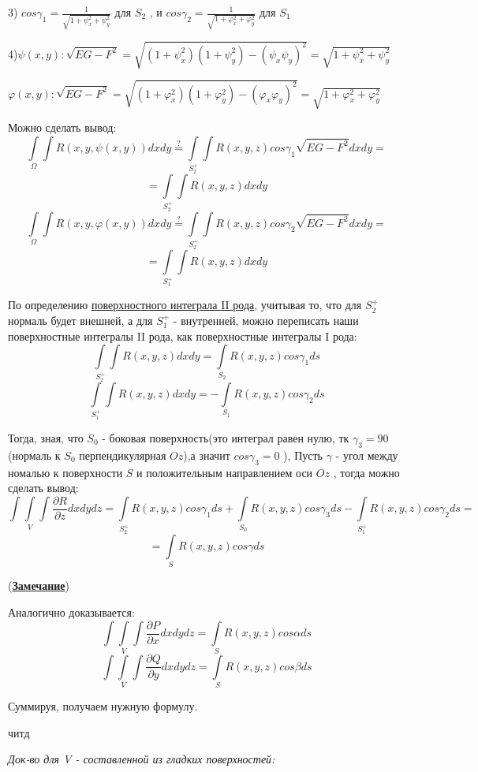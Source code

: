 \documentclass[12pt]{article}
\begin{document}
3) \hyperref[eq10]{$cos\gamma_1 = \frac{1}{\sqrt{1 + \psi_x^2 + \psi_y^2 }}$} для $S_2$ , и $cos\gamma_2 = \frac{1}{\sqrt{1 + \varphi_x^2 + \varphi_y^2 }} $ для $S_1$

4)$\psi(x,y) : \sqrt{EG - F^2} = \sqrt{(1 + \psi_x^2)(1 + \psi_y^2) - (\psi_x \psi_y)^2} = \sqrt{1 + \psi_x^2 + \psi_y^2 }$

  \par $\varphi(x,y) : \sqrt{EG - F^2} = \sqrt{(1 + \varphi_x^2)(1 + \varphi_y^2) - (\varphi_x \varphi_y)^2} = \sqrt{1 + \varphi_x^2 + \varphi_y^2 }$

Можно сделать вывод:
$$\int\limits_{\Omega}\int R(x,y,\psi(x,y))dxdy \stackrel{?}{=}\int\limits_{S_2^+}\int R(x,y,z)  cos\gamma_1 \sqrt{EG - F^2} dxdy = $$
$$ = \int\limits_{S_2^+}\int R(x,y,z)dxdy$$
$$ \int\limits_{\Omega}\int R(x,y,\varphi(x,y))dxdy \stackrel{?}{=}\int\limits_{S_2^+}\int R(x,y,z)  cos\gamma_2  \sqrt{EG - F^2} dxdy =$$
$$ = \int\limits_{S_1^+}\int R(x,y,z)dxdy $$


По определению \hyperref[eq9]{поверхностного интеграла II рода}, учитывая то, что для $S_2^+$
нормаль будет внешней, а для $S_1^+$ - внутренней, можно переписать наши поверхностные интегралы II рода,
как поверхностные интегралы I рода:
	$$\int\limits_{S_2^+}\int R(x,y,z)dxdy = \int\limits_{S_2} R(x,y,z)cos\gamma_1 ds$$
	$$\int\limits_{S_1^+}\int R(x,y,z)dxdy = -\int\limits_{S_1} R(x,y,z)cos\gamma_2 ds$$

Тогда, зная, что $S_0$ - боковая поверхность(это интеграл равен нулю, тк $\gamma_3 = 90$(нормаль к $S_0$ перпендикулярная $Oz$),а значит $cos\gamma_3 = 0$ ), Пусть $\gamma$ - угол между номалью к поверхности $S$ и положительным направлением оси $Oz$ ,
тогда можно сделать вывод:
$$
\int\int\limits_{V}\int \frac{\partial R}{\partial z}dxdydz = \int\limits_{S_2^+} R(x,y,z)cos\gamma_1 ds + 
\int\limits_{S_0} R(x,y,z)cos\gamma_3 ds - \int\limits_{S_1^+} R(x,y,z)cos\gamma_2 ds =
$$
$$
=
\int\limits_{S} R(x,y,z)cos\gamma ds 
$$

(\hyperref[eq11]{\textbf{Замечание}})

Аналогично доказывается:
$$
\int\int\limits_{V}\int \frac{\partial P}{\partial x}dxdydz = \int\limits_{S} R(x,y,z)cos\alpha ds 
$$
$$
\int\int\limits_{V}\int \frac{\partial Q}{\partial y}dxdydz = \int\limits_{S} R(x,y,z)cos\beta ds 
$$

Суммируя, получаем нужную формулу.

читд

\textit{Док-во для V - составленной из гладких поверхностей:}
\end{document}
